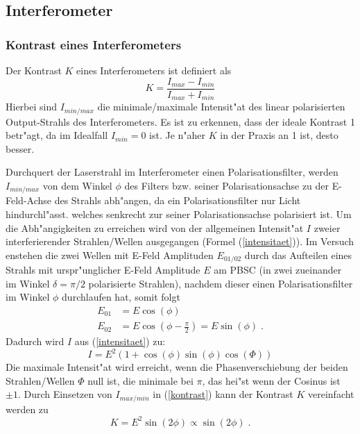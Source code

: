   \subsection{Interferometer}
    \subsubsection{Kontrast eines Interferometers}
      Der Kontrast $K$ eines Interferometers ist definiert als
      \begin{equation}
        K = \frac{I_{max}-I_{min}}{I_{max}+I_{min}}
        \label{kontrast}
      \end{equation}
      Hierbei sind $I_{min/max}$ die minimale/maximale Intensit"at des linear polarisierten Output-Strahls des Interferometers.
      Es ist zu erkennen, dass der ideale Kontrast 1 betr"agt, da im Idealfall $I_{min}=0$ ist.
      Je n"aher $K$ in der Praxis an 1 ist, desto besser.

      Durchquert der Laserstrahl im Interferometer einen Polarisationsfilter, werden $I_{min/max}$ von dem Winkel $\phi$ des Filters bzw. seiner Polarisationsachse zu der E-Feld-Achse des Strahls abh"angen, da ein Polarisationsfilter nur Licht hindurchl"asst. welches senkrecht zur seiner Polarisationsachse polarisiert ist.
      Um die Abh"angigkeiten zu erreichen wird von der allgemeinen Intensit"at $I$ zweier interferierender Strahlen/Wellen ausgegangen (Formel (\ref{intensitaet})).
      Im Versuch enstehen die zwei Wellen mit E-Feld Amplituden $E_{01/02}$ durch das Aufteilen eines Strahls mit urspr"unglicher E-Feld Amplitude $E$ am PBSC (in zwei zueinander im Winkel $\delta = \pi /2$ polarisierte Strahlen), nachdem dieser einen Polarisationsfilter im Winkel $\phi$ durchlaufen hat, somit folgt
      \begin{align}
        E_{01} &= E\cos(\phi)\\
        E_{02} &= E\cos{(\phi - \frac{\pi}{2})} = E\sin(\phi) \; .
      \end{align}
      Dadurch wird $I$ aus (\ref{intensitaet}) zu:
      \begin{equation}
        I = E^2(1+\cos(\phi)\sin(\phi)\cos(\Phi))
      \end{equation}
      Die maximale Intensit"at wird erreicht, wenn die Phasenverschiebung der beiden Strahlen/Wellen $\Phi$ null ist, die minimale bei $\pi$, das hei"st wenn der Cosinus ist $\pm 1$.
      Durch Einsetzen von $I_{max/min}$ in (\ref{kontrast}) kann der Kontrast $K$ vereinfacht werden zu
      \begin{equation}
        K = E^2\sin{(2\phi)} \propto \sin{(2\phi)} \; .
        \label{kontrast2}
      \end{equation}

